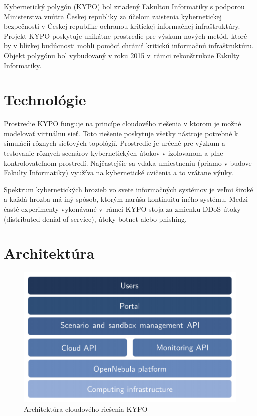 \documentclass[
  printed, %
  twoside, %
  notable,   %
  nolof,   %
  nolot,   %
]{fithesis3}
\begin{document}
Kybernetický polygón (KYPO) bol zriadený Fakultou Informatiky s podporou Ministerstva vnútra Českej republiky za účelom zaistenia kybernetickej bezpečnosti v Českej republike ochranou kritickej informačnej infraštruktúry. Projekt KYPO poskytuje unikátne prostredie pre výskum nových metód, ktoré by v blízkej budúcnosti mohli pomôcť chrániť kritickú informačnú infraštruktúru\cite{dankovvcikova2015konfigurace}. Objekt polygónu bol vybudovaný v roku 2015 v~rámci rekonštrukcie Fakulty Informatiky.

\section{Technológie}
Prostredie KYPO funguje na princípe cloudového riešenia v ktorom je možné modelovať virtuálnu sieť\cite{eichler2014analytical}. Toto riešenie poskytuje všetky nástroje potrebné k simulácii rôznych sieťových topológií. Prostredie je určené pre výzkum a testovanie rôznych scenárov kybernetických útokov v izolovanom a plne kontrolovateľnom prostredí\cite{vceleda2015kypo}. Najčastejšie sa vďaka umiestneniu (priamo v budove Fakulty Informatiky) využíva na kybernetické cvičenia a to vrátane výuky.

Spektrum kybernetických hrozieb vo svete informačných systémov je veľmi široké a každá hrozba má iný spôsob, ktorým narúša kontinuitu iného systému. Medzi časté experimenty vykonávané v~rámci KYPO stoja za zmienku DDoS útoky (distributed denial of service), útoky botnet alebo phishing\cite{vcegan2014navrh, celeda2013projekt}.

\section{Architektúra}
\begin{figure}
	\center
	\includegraphics[width=1.0\linewidth]{kypo_structure}
	\caption{Architektúra cloudového riešenia KYPO\cite{vceleda2015kypo}}
	\label{kypo_structure}
\end{figure}
\end{document}
